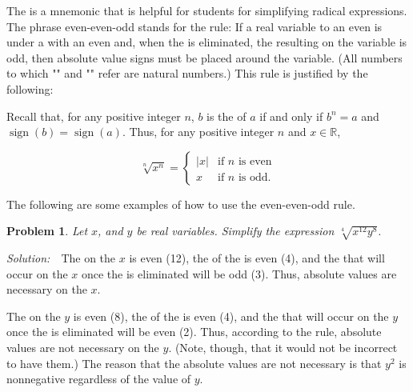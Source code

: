 \documentclass[12pt]{article}
\newtheorem*{prob*}{Problem}
\begin{document}

The  is a mnemonic that is helpful for students for simplifying radical expressions.  The phrase even-even-odd stands for the rule:  If a real variable to an even  is under a  with an even  and, when the  is eliminated, the resulting  on the variable is odd, then absolute value signs must be placed around the variable.  (All numbers to which "" and "" refer are natural numbers.)  This rule is justified by the following:

Recall that, for any positive integer $n$, $b$ is the  of $a$ if and only if $b^n=a$ and $\operatorname{sign}(b)=\operatorname{sign}(a)$.  Thus, for any positive integer $n$ and $x \in \mathbb{R}$,

$$\sqrt[n]{x^n}=\begin{cases}
|x| & \text{if } n \text{ is even} \\
x & \text{if } n \text{ is odd.} \end{cases}$$

The following are some examples of how to use the even-even-odd rule.

\begin{prob*}
Let $x$, and $y$ be real variables.  Simplify the expression $\sqrt[4]{x^{12}y^8}$.
\end{prob*}

{\sl Solution:\/}~~The  on the $x$ is even (12), the  of the  is even (4), and the  that will occur on the $x$ once the  is eliminated will be odd (3).  Thus, absolute values are necessary on the $x$.

The  on the $y$ is even (8), the  of the  is even (4), and the  that will occur on the $y$ once the  is eliminated will be even (2).  Thus, according to the rule, absolute values are not necessary on the $y$.  (Note, though, that it would not be incorrect to have them.)  The reason that the absolute values are not necessary is that $y^2$ is nonnegative regardless of the value of $y$.
\end{document}
